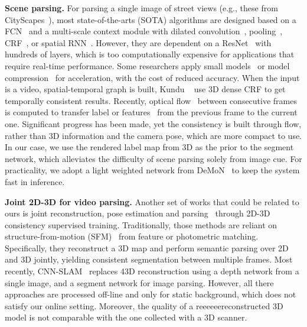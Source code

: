 \textbf{Scene parsing.} For parsing a single image of street views (e.g., these from CityScapes~\cite{Cordts2016Cityscapes}), most state-of-the-arts (SOTA) algorithms are designed based on a FCN~\cite{WuSH16e} and a multi-scale context module with dilated convolution~\cite{ChenPSA17}, pooling~\cite{ZhaoSQWJ16}, CRF~\cite{higherordercrf_ECCV2016}, or spatial RNN~\cite{byeon2015scene}. However, they are dependent on a ResNet~\cite{HeZRS15} with hundreds of layers, which is too computationally expensive for applications that require real-time performance. Some researchers apply small models~\cite{PaszkeCKC16} or model compression~\cite{ZhaoQSSJ17} for acceleration, with the cost of reduced accuracy.
When the input is a video, spatial-temporal graph is built, Kundu \etal~\cite{kundu2016feature} use 3D dense CRF to get temporally consistent results. Recently, optical flow~\cite{dosovitskiy2015flownet} between consecutive frames is computed to transfer label or features~\cite{gadde2017semantic,zhu2016deep} from the previous frame to the current one.  Significant progress has been made, yet the consistency is built through flow, rather than 3D information and the camera pose, which are more compact to use. In our case, we use the rendered label map from 3D as the prior to the segment network, which alleviates the difficulty of scene parsing solely from image cue. For practicality, we adopt a light weighted network from DeMoN~\cite{ummenhofer2016demon} to keep the system fast in inference.%


\textbf{Joint 2D-3D for video parsing.} Another set of works that could be related to ours is joint reconstruction, pose estimation and parsing~\cite{kundu2014joint,hane2013joint} through 2D-3D consistency supervised training.
 Traditionally, those methods are reliant on structure-from-motion (SFM)~\cite{hane2013joint} from feature or photometric matching. Specifically, they reconstruct a 3D map and perform semantic parsing over 2D and 3D jointly, yielding consistent segmentation between multiple frames.
 Most recently, CNN-SLAM~\cite{tateno2017cnn} replaces 43D reconstruction using a depth network from a single image, and a segment network for image parsing.
 However, all there approaches are processed off-line and only for static background, which does not satisfy our online setting. Moreover, the quality of a reeeeeereconstructed 3D model is not comparable with the one collected with a 3D scanner. %
